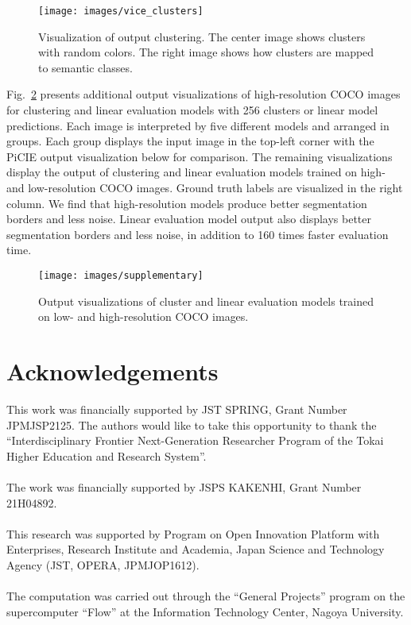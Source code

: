 \documentclass{bmvc2k}
\begin{document}
\begin{figure}
\begin{center}
\texttt{[image: images/vice\_clusters]}
\end{center}
   \caption{Visualization of output clustering. The center image shows clusters with random colors. The right image shows how clusters are mapped to semantic classes.}
\label{fig:cluster_viz}
\end{figure}

Fig.~\ref{fig:supplementary_viz} presents additional output visualizations of high-resolution COCO images for clustering and linear evaluation models with 256 clusters or linear model predictions. Each image is interpreted by five different models and arranged in groups. Each group displays the input image in the top-left corner with the PiCIE output visualization below for comparison. The remaining visualizations display the output of clustering and linear evaluation models trained on high- and low-resolution COCO images. Ground truth labels are visualized in the right column. We find that high-resolution models produce better segmentation borders and less noise. Linear evaluation model output also displays better segmentation borders and less noise, in addition to 160 times faster evaluation time.

\begin{figure}
\begin{center}
\texttt{[image: images/supplementary]}
\end{center}
   \caption{Output visualizations of cluster and linear evaluation models trained on low-
and high-resolution COCO images.}
\label{fig:supplementary_viz}
\end{figure}

\section*{Acknowledgements}

This work was financially supported by JST SPRING, Grant Number JPMJSP2125. The authors would like to take this opportunity to thank the ``Interdisciplinary Frontier Next-Generation Researcher Program of the Tokai Higher Education and Research System''.
\\
\\
The work was financially supported by JSPS KAKENHI, Grant Number 21H04892.
\\
\\
This research was supported by Program on Open Innovation Platform with Enterprises, Research Institute and Academia, Japan Science and Technology Agency (JST, OPERA, JPMJOP1612).
\\
\\
The computation was carried out through the ``General Projects'' program on the supercomputer ``Flow'' at the Information Technology Center, Nagoya University.


\end{document}
